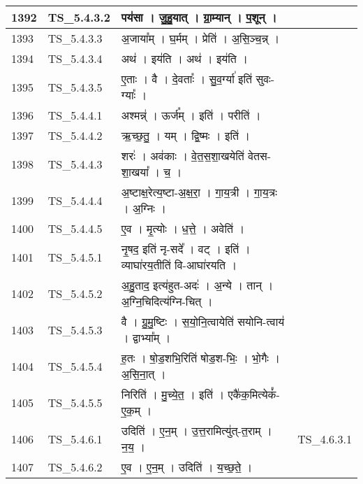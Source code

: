 \documentclass[17pt]{extarticle}
\begin{document}
\begin{longtable}{||p{0.4in}||p{0.9in}||p{4.0in}||p{0.9in}||}
        \hline
            1392 & TS\_5.4.3.2 & पय॑सा   ।   जु॒हु॒यात्   ।   ग्रा॒म्यान्   ।   प॒शून्   ।    &      \\
        \hline
            1393 & TS\_5.4.3.3 & अ॒जाया᳚म्   ।   घ॒र्मम्   ।   प्रेति॑   ।   अ॒सि॒ञ्च॒न्न्   ।    &      \\
        \hline
            1394 & TS\_5.4.3.4 & अथ॑   ।   इय॑ति   ।   अथ॑   ।   इय॑ति   ।    &      \\
        \hline
            1395 & TS\_5.4.3.5 & ए॒ताः   ।   वै   ।   दे॒वताः᳚   ।   सु॒व॒र्ग्या॑ इति॑ सुवः{-}ग्याः᳚   ।    &      \\
        \hline
            1396 & TS\_5.4.4.1 & अश्मन्न्॑   ।   ऊर्ज᳚म्   ।   इति॑   ।   परीति॑   ।    &      \\
        \hline
            1397 & TS\_5.4.4.2 & ऋ॒च्छ॒तु॒   ।   यम्   ।   द्वि॒ष्मः   ।   इति॑   ।    &      \\
        \hline
            1398 & TS\_5.4.4.3 & शरः॑   ।   अव॑काः   ।   वे॒त॒स॒शा॒खयेति॑ वेतस{-}शा॒खया᳚   ।   च॒   ।    &      \\
        \hline
            1399 & TS\_5.4.4.4 & अ॒ष्टाक्ष॒रेत्य॒ष्टा{-}अ॒क्ष॒रा॒   ।   गा॒य॒त्री   ।   गा॒य॒त्रः   ।   अ॒ग्निः   ।    &      \\
        \hline
            1400 & TS\_5.4.4.5 & ए॒व   ।   मृ॒त्योः   ।   ध॒त्ते॒   ।   अवेति॑   ।    &      \\
        \hline
            1401 & TS\_5.4.5.1 & नृ॒षद॒ इति॑ नृ{-}सदे᳚   ।   वट्   ।   इति॑   ।   व्याघा॑रय॒तीति॑ वि{-}आघा॑रयति   ।    &      \\
        \hline
            1402 & TS\_5.4.5.2 & अ॒हु॒ताद॒ इत्य॑हुत{-}अदः॑   ।   अ॒न्ये   ।   तान्   ।   अ॒ग्नि॒चिदित्य॑ग्नि{-}चित्   ।    &      \\
        \hline
            1403 & TS\_5.4.5.3 & वै   ।   ग्रु॒मु॒ष्टिः   ।   स॒यो॒नि॒त्वायेति॑ सयोनि{-}त्वाय॑   ।   द्वाभ्या᳚म्   ।    &      \\
        \hline
            1404 & TS\_5.4.5.4 & ह॒तः   ।   षो॒ड॒शभि॒रिति॑ षोड॒श{-}भिः॒   ।   भो॒गैः   ।   अ॒सि॒ना॒त्   ।    &      \\
        \hline
            1405 & TS\_5.4.5.5 & निरिति॑   ।   मु॒च्ये॒त॒   ।   इति॑   ।   एकै॑क॒मित्येकं᳚{-}ए॒क॒म्   ।    &      \\
        \hline
            1406 & TS\_5.4.6.1 & उदिति॑   ।   ए॒न॒म्   ।   उ॒त्त॒रामित्यु॑त्{-}त॒राम्   ।   न॒य॒   ।    & TS\_4.6.3.1        \\
        \hline
            1407 & TS\_5.4.6.2 & ए॒व   ।   ए॒न॒म्   ।   उदिति॑   ।   य॒च्छ॒ते॒   ।    &      \\

\end{longtable}
\end{document}
